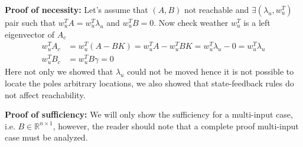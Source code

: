 \documentclass[twoside]{article}
\begin{document}
\textbf{Proof of necessity: } Let's assume that $(A,B)$ not reachable and $\exists (\lambda_u , w_u^T)$ pair such that
$w_u^T A = w_u^T \lambda_u $ and $w_u^T B = 0$. Now check weather $w_u^T$ is a left eigenvector of $A_c$
%
\begin{align*}
	w_u^T A_c &= w_u^T (A - B K ) = w_u^T A - w_u^T B K = w_u^T \lambda_u - 0 = w_u^T \lambda_u
	\\
	w_u^T B_c &= w_u^T B \gamma = 0
\end{align*} 
%
Here not only we showed that $\lambda_u$ could not be moved hence it is not possible to locate the poles
arbitrary locations, we also showed that state-feedback rules do not affect reachability.

\textbf{Proof of sufficiency:} We will only show the sufficiency for a multi-input case, i.e. $B \in \mathbb{R}^{n \times 1}$, 
however, the reader should note that a complete proof multi-input case must be analyzed. 
\end{document}
